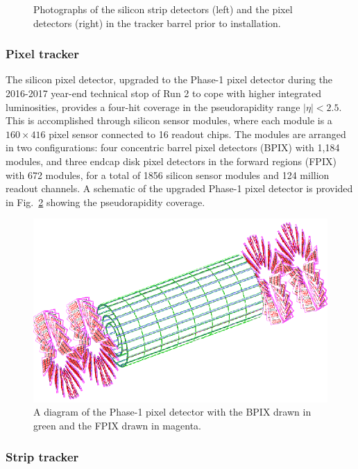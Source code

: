 \begin{figure}[H]
{    } 
    \caption{Photographs of the silicon strip detectors (left) and the pixel detectors (right) in the tracker barrel prior to installation.}
    \label{fig:Tracker}
\end{figure}

\subsubsection{Pixel tracker} \label{sec:PixelTracker}

The silicon pixel detector, upgraded to the Phase-1 pixel detector \cite{PixelUpgrade} during the 2016-2017 year-end technical stop of Run 2 to cope with higher integrated luminosities, provides a four-hit coverage in the pseudorapidity range $|\eta|<2.5$. This is accomplished through silicon sensor modules, where each module is a $160\times 416$ pixel sensor connected to 16 readout chips. The modules are arranged in two configurations: four concentric barrel pixel detectors (BPIX) with 1,184 modules, and three endcap disk pixel detectors in the forward regions (FPIX) with 672 modules, for a total of 1856 silicon sensor modules and 124 million readout channels. A schematic of the upgraded Phase-1 pixel detector is provided in Fig.~\ref{fig:PixelDiagram} showing the pseudorapidity coverage.

\begin{figure}[H]
    \centering
    \includegraphics[width=\textwidth]{Images/CMS/PixelDiagram2.png}
    \caption{A diagram of the Phase-1 pixel detector with the BPIX drawn in green and the FPIX drawn in magenta.}
    \label{fig:PixelDiagram}
\end{figure}

\subsubsection{Strip tracker} \label{sec:StripTracker}

